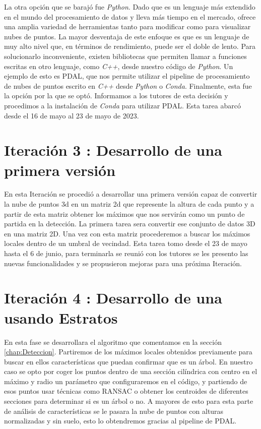 La otra opción que se barajó fue \textit{Python}. Dado que es un lenguaje más extendido en el mundo del procesamiento de datos y lleva más tiempo en el mercado, ofrece una amplia variedad de herramientas tanto para modificar como para visualizar nubes de puntos. La mayor desventaja de este enfoque es que es un lenguaje de muy alto nivel que, en términos de rendimiento, puede ser el doble de lento. Para solucionarlo inconveniente, existen bibliotecas que permiten llamar a funciones escritas en otro lenguaje, como \textit{C++}, desde nuestro código de \textit{Python}. Un ejemplo de esto es PDAL, que nos permite utilizar el pipeline de procesamiento de nubes de puntos escrito en \textit{C++} desde \textit{Python} o \textit{Conda}. Finalmente, esta fue la opción por la que se optó. Informamos a los tutores de esta decisión y procedimos a la instalación de \textit{Conda} para utilizar PDAL. Esta tarea abarcó desde el 16 de mayo al 23 de mayo de 2023.


\section{Iteración 3 : Desarrollo de una primera versión}
En esta Iteración se procedió a desarrollar una primera versión capaz de convertir la nube de puntos 3d en un matriz 2d que represente la altura de cada punto y a partir de esta matriz obtener los máximos que nos servirán como un punto de partida en la detección.
La primera tarea sera convertir ese conjunto de datos 3D en una matriz 2D. Una vez con esta matriz procederemos a buscar los máximos locales dentro de un umbral de vecindad. Esta tarea tomo desde el 23 de mayo hasta el 6 de junio, para terminarla se reunió con los tutores se les presento las nuevas funcionalidades y se propusieron mejoras para una próxima Iteración. 

\section{Iteración 4 : Desarrollo de una  usando Estratos }
En esta fase se desarrollara el algoritmo que comentamos en la sección \ref{chap:Deteccion}. Partiremos de los máximos locales obtenidos previamente para buscar en ellos características que puedan confirmar que es un árbol. En nuestro caso se opto por coger los puntos dentro de una sección cilíndrica con centro en el máximo y radio un parámetro que configuraremos en el código, y partiendo de esos puntos usar técnicas como RANSAC o obtener los centroides de diferentes secciones para determinar si es un árbol o no. A mayores de esto para esta parte de análisis de características se le pasara la nube de puntos con alturas normalizadas y sin suelo, esto lo obtendremos gracias al pipeline de PDAL.

